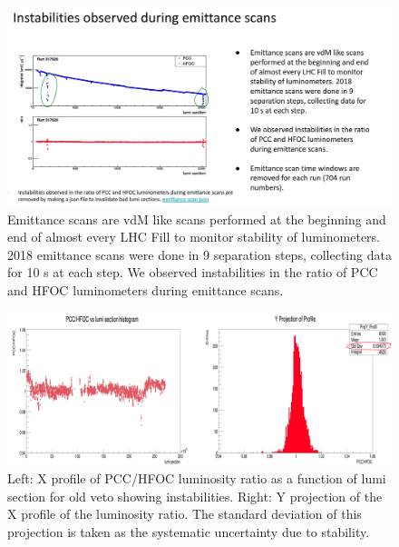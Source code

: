 \begin{figure}[!htp]
\centering
\includegraphics[width=1\textwidth]{ashish_thesis/emittance_scans.png}
\caption{%
   Emittance scans are vdM like scans performed at the beginning and end of almost every LHC Fill to monitor stability of luminometers. 2018 emittance scans were done in 9 separation steps, collecting data for 10 s at each step. We observed instabilities in the ratio of PCC and HFOC luminometers during emittance scans. 
}
\label{fig:emitscan}
\end{figure}


\begin{figure}[!htp]
\centering
\includegraphics[width=1\textwidth]{ashish_thesis/pcc_hfoc_ratio_stability_old_veto.png}
\caption{%
   Left: X profile of PCC/HFOC luminosity ratio as a function of lumi section for old veto showing instabilities.  Right: Y projection of the X profile of the luminosity ratio. The standard deviation of this projection is taken as the systematic uncertainty due to stability.
}
\label{fig:pcc_hfoc_old}
\end{figure}

